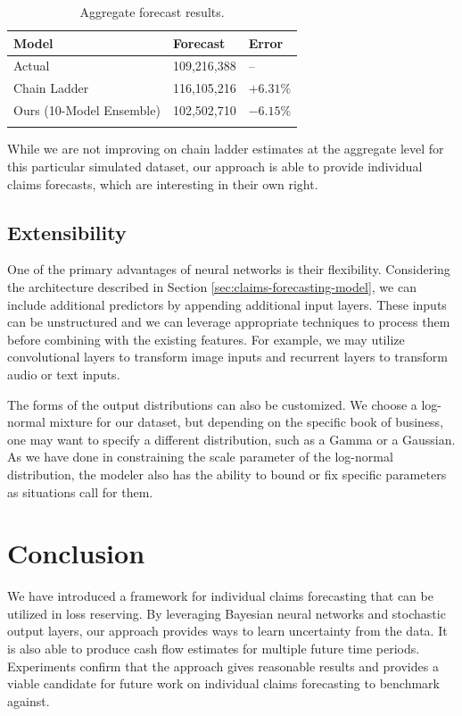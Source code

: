 \documentclass{article}
\begin{document}
\begin{table}[ht]
\centering
\begin{tabular}[t]{lll}
\toprule
Model & Forecast & Error\\
\midrule
Actual                                & 109,216,388  & --\\
Chain Ladder                          & 116,105,216  & $+6.31\%$\\
Ours (10-Model Ensemble)              & 102,502,710  & $-6.15\%$\\
\bottomrule\\[1ex]
\end{tabular}
\caption{Aggregate forecast results.}
\label{table:results}
\end{table}%

While we are not improving on chain ladder estimates at the aggregate level for this particular simulated dataset, our approach is able to provide individual claims forecasts, which are interesting in their own right.

\subsection{Extensibility}

One of the primary advantages of neural networks is their flexibility. Considering the architecture described in Section \ref{sec:claims-forecasting-model}, we can include additional predictors by appending additional input layers. These inputs can be unstructured and we can leverage appropriate techniques to process them before combining with the existing features. For example, we may utilize convolutional layers to transform image inputs and recurrent layers to transform audio or text inputs.

The forms of the output distributions can also be customized. We choose a log-normal mixture for our dataset, but depending on the specific book of business, one may want to specify a different distribution, such as a Gamma or a Gaussian. As we have done in constraining the scale parameter of the log-normal distribution, the modeler also has the ability to bound or fix specific parameters as situations call for them.

\section{Conclusion}

We have introduced a framework for individual claims forecasting that can be utilized in loss reserving. By leveraging Bayesian neural networks and stochastic output layers, our approach provides ways to learn uncertainty from the data. It is also able to produce cash flow estimates for multiple future time periods. Experiments confirm that the approach gives reasonable results and provides a viable candidate for future work on individual claims forecasting to benchmark against.
\end{document}
